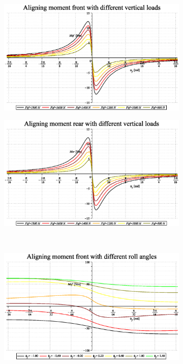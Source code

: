 \begin{figure}
    \begin{subfigure}{.5\textwidth}
        \includegraphics[width=\linewidth]{MotoModel_tex/MotoModelplot2d11.eps}
        \caption{}
        \label{fig:sa1a}
    \end{subfigure}%
    \begin{subfigure}{.5\textwidth}
        \includegraphics[width=\linewidth]{MotoModel_tex/MotoModelplot2d12.eps}
        \caption{}
        \label{fig:sa1b}
    \end{subfigure}\\
    \begin{subfigure}{.5\textwidth}
        \includegraphics[width=\linewidth]{MotoModel_tex/MotoModelplot2d13.eps}

\end{subfigure}
\end{figure}

